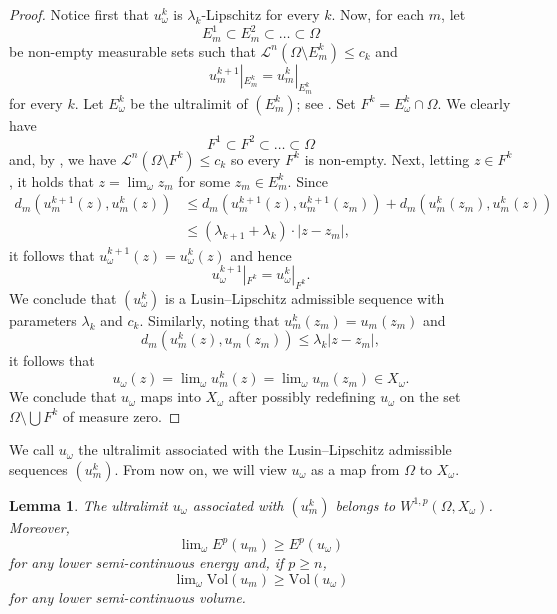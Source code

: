 \documentclass[a4paper,leqno]{amsart}
\numberwithin{equation}{section}
\newtheorem{lemma}[theorem]{Lemma}
\theoremstyle{remark}
\theoremstyle{remark}
\newcommand{\lm}{\mathscr{L}}
\begin{document}
\begin{proof}
    Notice first that $u_\omega^k$ is $\lambda_k$-Lipschitz for every $k$. Now, for each $m$, let $$E_m^1\subset E_m^2\subset\dots\subset \Omega$$ be non-empty measurable sets such that $\lm^n(\Omega\setminus E_m^k)\leq c_k$ and $$u_m^{k+1}|_{E_m^k} = u_m^k|_{E_m^k}$$ for every $k$. Let $E_\omega^k$ be the ultralimit of $( E_m^k )$; see . Set $F^k=E_\omega^k\cap \Omega$. We clearly have $$F^1\subset F^2\subset\dots\subset\Omega$$ and, by , we have $\lm^n(\Omega \setminus F^k)\leq c_k$ so every $F^k$ is non-empty. Next, letting $z\in F^k$, it holds that $z=\lim\nolimits_{\omega} z_m$ for some $z_m\in E_m^k$. Since 
    \begin{equation*}
    \begin{split}
        d_m(u_m^{k+1}(z), u_m^k(z))&\leq d_m(u_m^{k+1}(z), u_m^{k+1}(z_m)) + d_m(u_m^k(z_m), u_m^k(z))\\
        &\leq (\lambda_{k+1}+\lambda_k)\cdot |z-z_m|,
    \end{split}
    \end{equation*}
    it follows that $u_\omega^{k+1}(z) = u_\omega^k(z)$ and hence $$u_\omega^{k+1}|_{F^k} = u_\omega^k|_{F^k}.$$ We conclude that $(u_\omega^k)$ is a Lusin--Lipschitz admissible sequence with parameters $\lambda_k$ and $c_k$. Similarly, noting that $u_m^k(z_m) = u_m(z_m)$ and $$d_m(u_m^k(z), u_m(z_m))\leq \lambda_k |z-z_m|,$$ it follows that
    $$u_\omega(z) = \lim\nolimits_\omega u_m^k(z) = \lim\nolimits_\omega u_m(z_m)\in X_\omega.$$
    We conclude that $u_\omega$ maps into $X_\omega$ after possibly redefining $u_\omega$ on the set $\Omega \setminus \bigcup F^k$ of measure zero.
\end{proof}



We call $u_\omega$ the ultralimit associated with the Lusin--Lipschitz admissible sequences $(u_m^k)$. From now on, we will view $u_\omega$ as a map from $\Omega$ to $X_\omega$.


\begin{lemma}\label{lemma-lusin-lipschitz-admissibility}
    The ultralimit $u_\omega$ associated with $( u_m^k )$ belongs to $W^{1,p}(\Omega, X_\omega)$. Moreover,
    \begin{equation*}
        \lim\nolimits_{\omega} E^{p}( u_m ) \geq E^{p}( u_\omega )
    \end{equation*}
    for any lower semi-continuous energy and, if $p \geq n$,
    \begin{equation*}
        \lim\nolimits_{\omega} \mathrm{Vol}( u_m ) \geq \mathrm{Vol}( u_\omega )
    \end{equation*}
    for any lower semi-continuous volume.
\end{lemma}
\end{document}
